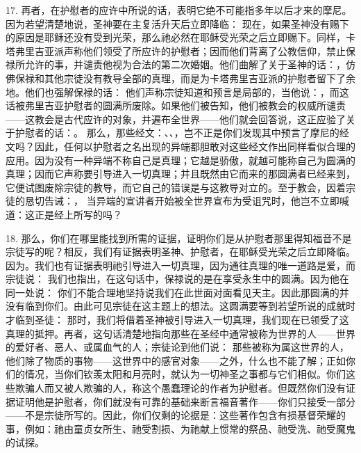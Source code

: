 17. 再者，在护慰者的应许中所说的话，表明它绝不可能指多年以后才来的摩尼。因为若望清楚地说，圣神要在主复活升天后立即降临： 现在，如果圣神没有赐下的原因是耶稣还没有受到光荣，那么祂必然在耶稣受光荣之后立即赐下。同样，卡塔弗里吉亚派声称他们领受了所应许的护慰者；因而他们背离了公教信仰，禁止保禄所允许的事，并谴责他视为合法的第二次婚姻。他们曲解了关于圣神的话：，仿佛保禄和其他宗徒没有教导全部的真理，而是为卡塔弗里吉亚派的护慰者留下了余地。他们也强解保禄的话： 他们声称宗徒知道和预言是局部的，当他说：，而这话被弗里吉亚护慰者的圆满所废除。如果他们被告知，他们被教会的权威所谴责——这教会是古代应许的对象，并遍布全世界——他们就会回答说，这正应验了关于护慰者的话：。 那么，那些经文：、、，岂不正是你们发现其中预言了摩尼的经文吗？因此，任何以护慰者之名出现的异端都胆敢对这些经文作出同样看似合理的应用。因为没有一种异端不称自己是真理；它越是骄傲，就越可能称自己为圆满的真理；因而它声称要引导进入一切真理；并且既然由它而来的那圆满者已经来到，它便试图废除宗徒的教导，而它自己的错误是与这教导对立的。至于教会，因着宗徒的恳切告诫：， 当异端的宣讲者开始被全世界宣布为受诅咒时，他岂不立即喊道：这正是经上所写的吗？\par

18. 那么，你们在哪里能找到所需的证据，证明你们是从护慰者那里得知福音不是宗徒写的呢？相反，我们有证据表明圣神、护慰者，在耶稣受光荣之后立即降临。因为。我们也有证据表明祂引导进入一切真理，因为通往真理的唯一道路是爱，而宗徒说： 我们也指出，在这句话中，保禄说的是在享受永生中的圆满。因为他在同一处说： 你们不能合理地坚持说我们在此世面对面看见天主。因此那圆满的并没有临到你们。由此可见宗徒在这主题上的想法。这圆满要等到若望所说的成就时才临到圣徒： 那时，我们将借着圣神被引导进入一切真理，我们现在已领受了这真理的抵押。再者，这句话清楚地指向那些在圣经中通常被称为世界的人——世界的爱好者、恶人、或属血气的人；宗徒论到他们说： 那些被称为属这世界的人，他们除了物质的事物——这世界中的感官对象——之外，什么也不能了解；正如你们的情况，当你们钦羡太阳和月亮时，就认为一切神圣之事都与它们相似。你们这些欺骗人而又被人欺骗的人，称这个愚蠢理论的作者为护慰者。但既然你们没有证据证明他是护慰者，你们就没有可靠的基础来断言福音著作——你们只接受一部分——不是宗徒所写的。因此，你们仅剩的论据是：这些著作包含有损基督荣耀的事，例如：祂由童贞女所生、祂受割损、为祂献上惯常的祭品、祂受洗、祂受魔鬼的试探。\par

